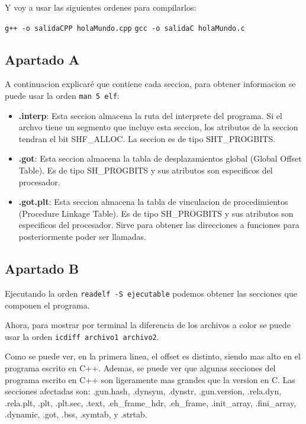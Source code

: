 \documentclass{article}
\begin{document}
Y voy a usar las siguientes ordenes para compilarlos:

\verb|g++ -o salidaCPP holaMundo.cpp|
\verb|gcc -o salidaC holaMundo.c|


\subsection*{Apartado A}
A continuacion explicaré que contiene cada seccion, para obtener informacion se puede usar la orden \verb|man 5 elf|:

\begin{itemize}
    \item \textbf{.interp}: Esta seccion almacena la ruta del interprete del programa. Si el archvo tiene un segmento que incluye esta seccion, los atributos de la seccion tendran el bit SHF\_ALLOC. La seccion es de tipo SHT\_PROGBITS.
    
    \item \textbf{.got}: Esta seccion almacena la tabla de desplazamientos global (Global Offset Table). Es de tipo SH\_PROGBITS y sus atributos son especificos del procesador. 
    
    \item \textbf{.got.plt}: Esta seccion almacena la tabla de vinculacion de procedimientos (Procedure Linkage Table). Es de tipo SH\_PROGBITS y sus atributos son especificos del procesador. Sirve para obtener las direcciones a funciones para posteriormente poder ser llamadas.
\end{itemize}


\subsection*{Apartado B}

Ejecutando la orden \verb|readelf -S ejecutable| podemos obtener las secciones que componen el programa.



Ahora, para mostrar por terminal la diferencia de los archivos a color se puede usar la orden \verb|icdiff archivo1 archivo2|.


Como se puede ver, en la primera linea, el offset es distinto, siendo mas alto en el programa escrito en C++. Ademas, se puede ver que algunas secciones del programa escrito en C++ son ligeramente mas grandes que la version en C. Las secciones afectadas son: .gun.hash, .dynsym, .dynstr, .gun.version, .rela.dyn, .rela.plt, .plt, .plt.sec, .text, .eh\_frame\_hdr, .eh\_frame, .init\_array, .fini\_array, .dynamic, .got, .bss, .symtab, y .strtab.
\end{document}
